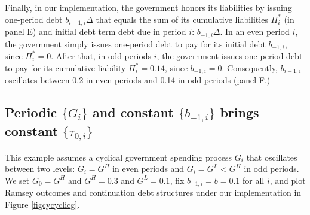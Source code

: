 \documentclass[12pt]{article}
\newcommand{\NW}[1]{{\textcolor{blue}{#1}}}
\begin{document}
Finally, in our implementation, the government honors its liabilities by issuing one-period debt $b_{i-1,i} \Delta $ that  equals the sum of its  cumulative liabilities $\Pi_i^\ast$ (in panel E) and initial debt term debt due in period $i$: $b_{-1,i} \Delta$. %
In an even period $i$, the government simply issues one-period debt to pay for its initial debt $b_{-1,i}$, since $\Pi_{i}^\ast=0$. After that,  in  odd periods $i$, the government  issues one-period debt to pay for its cumulative liability $\Pi_{i}^\ast=0.14$, since $b_{-1,i}=0$. Consequently,  $b_{i-1,i}$ oscillates between 0.2 in  even periods and 0.14 in  odd periods (panel F.) 



%
%
%

\subsection{Periodic $\{G_i\}$  and constant $\{b_{-1,i}\}$ brings constant $\{\tau_{0,i}\}$}\label{subsecperiodicG} %
This example assumes  a cyclical government spending process  $G_{i}$ that oscillates between two levels: $G_{i} = G^H$ in even  periods and $G_{i} = G^L<G^H$  in odd periods. We set 
 $G_{0}=G^H$ and $G^H=0.3$ and $G^L=0.1$, fix $b_{-1,i}=b=0.1$ for all $i$, and plot Ramsey outcomes and continuation debt structures under our implementation in Figure \ref{figcycyclicg}. 
\end{document}
